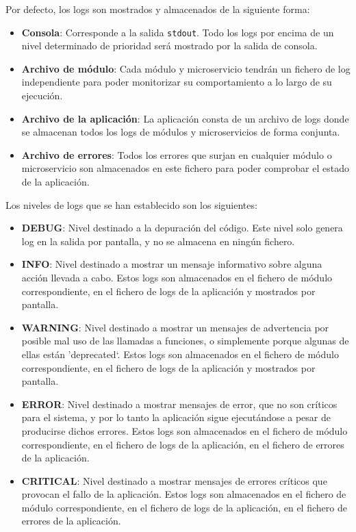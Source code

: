 \newpage

Por defecto, los logs son mostrados y almacenados de la siguiente forma:

\begin{itemize}
\item \textbf{Consola}: Corresponde a la salida \texttt{stdout}. Todo los logs por encima de un nivel determinado de prioridad será mostrado por la salida de consola.

\item \textbf{Archivo de módulo}: Cada módulo y microservicio tendrán un fichero de log independiente para poder monitorizar su comportamiento a lo largo de su ejecución.

\item \textbf{Archivo de la aplicación}: La aplicación consta de un archivo de logs donde se almacenan todos los logs de módulos y microservicios de forma conjunta.

\item \textbf{Archivo de errores}: Todos los errores que surjan en cualquier módulo o microservicio son almacenados en este fichero para poder comprobar el estado de la aplicación.

\end{itemize}

Los niveles de logs que se han establecido son los siguientes:

\begin{itemize}

\item \textbf{DEBUG}: Nivel destinado a la depuración del código. Este nivel solo genera log en la salida por pantalla, y no se almacena en ningún fichero.

\item \textbf{INFO}: Nivel destinado a mostrar un mensaje informativo sobre alguna acción llevada a cabo. Estos logs son almacenados en el fichero de módulo correspondiente, en el fichero de logs de la aplicación y mostrados por pantalla.

\item \textbf{WARNING}: Nivel destinado a mostrar un mensajes de advertencia por posible mal uso de las llamadas a funciones, o simplemente porque algunas de ellas están '{deprecated}`. Estos logs son almacenados en el fichero de módulo correspondiente, en el fichero de logs de la aplicación y mostrados por pantalla.

\item \textbf{ERROR}: Nivel destinado a mostrar mensajes de error, que no son críticos para el sistema, y por lo tanto la aplicación sigue ejecutándose a pesar de producirse dichos errores. Estos logs son almacenados en el fichero de módulo correspondiente, en el fichero de logs de la aplicación, en el fichero de errores de la aplicación.

\item \textbf{CRITICAL}: Nivel destinado a mostrar mensajes de errores críticos que provocan el fallo de la aplicación. Estos logs son almacenados en el fichero de módulo correspondiente, en el fichero de logs de la aplicación, en el fichero de errores de la aplicación.

\end{itemize}



